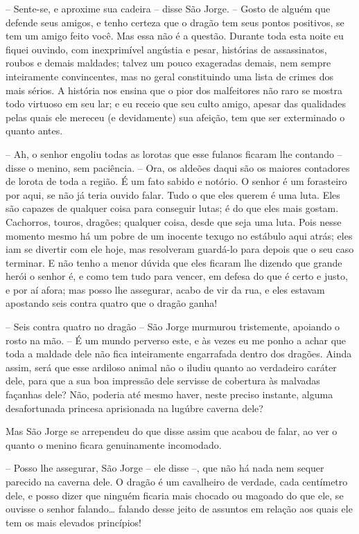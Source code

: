 -- Sente-se, e aproxime sua cadeira -- disse São Jorge. -- Gosto de
alguém que defende seus amigos, e tenho certeza que o dragão tem seus
pontos positivos, se tem um amigo feito você. Mas essa não é a
questão. Durante toda esta noite eu fiquei ouvindo, com inexprimível
angústia e pesar, histórias de assassinatos, roubos e demais
maldades; talvez um pouco exageradas demais, nem sempre inteiramente
convincentes, mas no geral constituindo uma lista de crimes dos mais
sérios. A história nos ensina que o pior dos malfeitores não raro se
mostra todo virtuoso em seu lar; e eu receio que seu culto amigo,
apesar das qualidades pelas quais ele mereceu (e devidamente) sua
afeição, tem que ser exterminado o quanto antes.

-- Ah, o senhor engoliu todas as lorotas que esse fulanos ficaram lhe
contando -- disse o menino, sem paciência. -- Ora, os aldeões daqui são
os maiores contadores de lorota de toda a região. É um fato sabido e
notório. O senhor é um forasteiro por aqui, se não já teria ouvido
falar. Tudo o que eles querem é uma luta. Eles são capazes de
qualquer coisa para conseguir lutas; é do que eles mais gostam.
Cachorros, touros, dragões; qualquer coisa, desde que seja uma luta.
Pois nesse momento mesmo há um pobre de um inocente texugo no
estábulo aqui atrás; eles iam se divertir com ele hoje, mas
resolveram guardá-lo para depois que o seu caso terminar. E não tenho
a menor dúvida que eles ficaram lhe dizendo que grande herói o senhor
é, e como tem tudo para vencer, em defesa do que é certo e justo, e
por aí afora; mas posso lhe assegurar, acabo de vir da rua, e eles
estavam apostando seis contra quatro que o dragão ganha!

-- Seis contra quatro no dragão -- São Jorge murmurou tristemente,
apoiando o rosto na mão. -- É um mundo perverso este, e às vezes eu me
ponho a achar que toda a maldade dele não fica inteiramente
engarrafada dentro dos dragões. Ainda assim, será que esse ardiloso
animal não o iludiu quanto ao verdadeiro caráter dele, para que a sua
boa impressão dele servisse de cobertura às malvadas façanhas dele?
Não, poderia até mesmo haver, neste preciso instante, alguma
desafortunada princesa aprisionada na lugúbre caverna dele?

Mas São Jorge se arrependeu do que disse assim que acabou de falar, ao
ver o quanto o menino ficara genuinamente incomodado.

-- Posso lhe assegurar, São Jorge -- ele disse --, que não há nada nem
sequer parecido na caverna dele. O dragão é um cavalheiro de verdade,
cada centímetro dele, e posso dizer que ninguém ficaria mais chocado
ou magoado do que ele, se ouvisse o senhor falando… falando desse
jeito de assuntos em relação aos quais ele tem os mais elevados
princípios!

